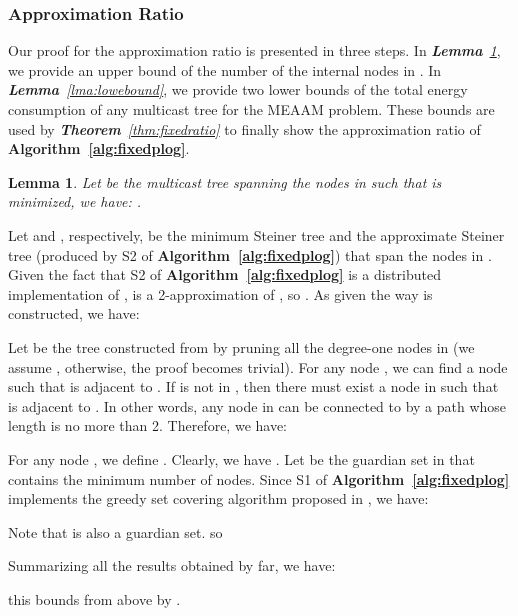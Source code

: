 \documentclass[10pt, conference, compsocconf]{IEEEtran}
\newtheorem{lemma}{\textbf{Lemma}}
\begin{document}
    \subsubsection{Approximation Ratio} Our proof for the approximation ratio is presented in three steps. In \textit{\textbf{Lemma}~\ref{lma:inner}}, we provide an upper bound of the number of the internal nodes in . In \textit{\textbf{Lemma}~\ref{lma:lowebound}}, we provide two lower bounds of the total energy consumption of any multicast tree for the MEAAM problem. These bounds are used by \textit{\textbf{Theorem}~\ref{thm:fixedratio}} to finally show the approximation ratio of \textbf{Algorithm~\ref{alg:fixedplog}}.
\begin{lemma}
Let  be the multicast tree spanning the nodes in  such that  is minimized, we have: .
      \label{lma:inner}
\end{lemma}
\begin{IEEEproof}
Let  and , respectively, be the minimum Steiner tree and the approximate Steiner tree (produced by S2 of \textbf{Algorithm~\ref{alg:fixedplog}}) that span the nodes in . Given the fact that S2 of \textbf{Algorithm~\ref{alg:fixedplog}} is a distributed implementation of \cite{Kou1981},  is a 2-approximation of , so . As  given the way  is constructed, we have:


      Let  be the tree constructed from  by pruning all the degree-one nodes in  (we assume , otherwise, the proof becomes trivial). For any node , we can find a node  such that  is adjacent to . If  is not in , then there must exist a node  in  such that  is adjacent to . In other words, any node in  can be connected to  by a path whose length is no more than 2. Therefore, we have:


      For any node , we define . Clearly, we have . Let  be the guardian set in  that contains the minimum number of nodes. Since S1 of \textbf{Algorithm~\ref{alg:fixedplog}} implements the greedy set covering algorithm proposed in \cite{Cormen2001}, we have:


      Note that  is also a guardian set. so


      Summarizing all the results obtained by far, we have:

this bounds  from above by .
    \end{IEEEproof}
\end{document}
